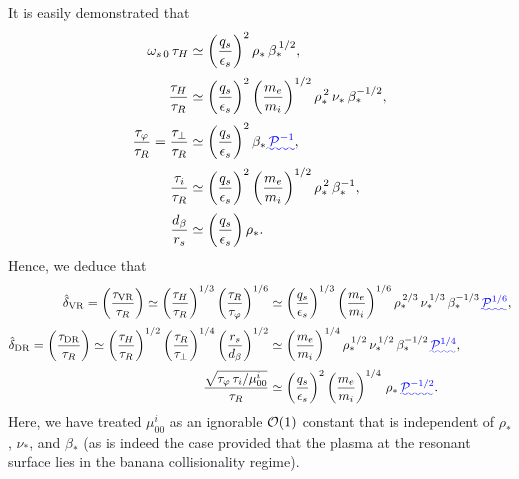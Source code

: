 \documentclass[12pt,prb,aps]{revtex4-1}
\providecommand{\DIFadd}[1]{{\protect\color{blue}\uwave{#1}}} %
\providecommand{\DIFaddbegin}{} %
\providecommand{\DIFaddend}{} %
\begin{document}
It is easily demonstrated that
\begin{align}
\omega_{s\,0}\,\tau_H&\simeq \left(\frac{q_s}{\epsilon_s}\right)^2\rho_\ast\,\beta_\ast^{\,1/2},\\[0.5ex]
\frac{\tau_H}{\tau_R}&\simeq \left(\frac{q_s}{\epsilon_s}\right)^2\left(\frac{m_e}{m_i}\right)^{1/2}\rho_\ast^{\,2}\,\nu_\ast\,\beta_\ast^{-1/2},\\[0.5ex]
\frac{\tau_\varphi}{\tau_R} = \frac{\tau_\perp}{\tau_R} &\simeq \left(\frac{q_s}{\epsilon_s}\right)^2\beta_\ast\DIFaddbegin \DIFadd{\,{\cal P}^{-1}}\DIFaddend ,\\[0.5ex]
\frac{\tau_i}{\tau_R} &\simeq  \left(\frac{q_s}{\epsilon_s}\right)^2\left(\frac{m_e}{m_i}\right)^{1/2}\rho_\ast^{\,2}\,\beta_\ast^{-1},\\[0.5ex]
\frac{d_\beta}{r_s} &\simeq \left(\frac{q_s}{\epsilon_s}\right)\rho_\ast.
\end{align} 
Hence, we deduce that 
\begin{align}
\hat{\delta}_{\rm VR} = \left(\frac{\tau_{\rm VR}}{\tau_R}\right) \simeq\left(\frac{\tau_H}{\tau_R}\right)^{1/3}\left(\frac{\tau_R}{\tau_\varphi}\right)^{1/6}&\simeq \left(\frac{q_s}{\epsilon_s}\right)^{1/3}\left(\frac{m_e}{m_i}\right)^{1/6}\rho_\ast^{\,2/3}\,\nu_\ast^{\,1/3}\,\beta_\ast^{-1/3}\DIFaddbegin \DIFadd{\,{\cal P}^{1/6}}\DIFaddend ,\\[0.5ex]
\hat{\delta}_{\rm DR} = \left(\frac{\tau_{\rm DR}}{\tau_R}\right) \simeq \left(\frac{\tau_H}{\tau_R}\right)^{1/2}\left(\frac{\tau_R}{\tau_\perp}\right)^{1/4}\left(\frac{r_s}{d_\beta}\right)^{1/2}&\simeq \left(\frac{m_e}{m_i}\right)^{1/4}\rho_\ast^{\,1/2}\,\nu_\ast^{\,1/2}\,\beta_\ast^{-1/2}\DIFaddbegin \DIFadd{\,{\cal P}^{1/4}}\DIFaddend ,\\[0.5ex]
\frac{\sqrt{\tau_\varphi\, \tau_i/\mu_{00}^i}}{\tau_R}&\simeq \left(\frac{q_s}{\epsilon_s}\right)^2\left(\frac{m_e}{m_i}\right)^{1/4}\,\rho_\ast\DIFaddbegin \DIFadd{\,{\cal P}^{-1/2}}\DIFaddend .
\end{align}
Here, we have treated $\mu_{00}^i$ as an ignorable ${\cal O}(1)$ constant that is independent of $\rho_\ast$, $\nu_\ast$, and
$\beta_\ast$ (as is indeed the case provided that the plasma at the resonant surface lies in the banana collisionality regime).\cite{hs} 
\end{document}
